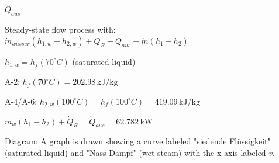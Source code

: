 \( \dot{Q}_{aus} \)  

Steady-state flow process with:  
\( \dot{m}_{wasser} (h_{1,w} - h_{2,w}) + \dot{Q}_R - \dot{Q}_{aus} + \dot{m}(h_{1} - h_{2}) \)  

\( h_{1,w} = h_f(70^\circ C) \) (saturated liquid)  

A-2:  
\( h_f(70^\circ C) = 202.98 \, \text{kJ/kg} \)  

A-4/A-6:  
\( h_{2,w}(100^\circ C) = h_f(100^\circ C) = 419.09 \, \text{kJ/kg} \)  

\( \dot{m}_w(h_1 - h_2) + \dot{Q}_R = \dot{Q}_{aus} = 62.782 \, \text{kW} \)  

Diagram:  
A graph is drawn showing a curve labeled "siedende Flüssigkeit" (saturated liquid) and "Nass-Dampf" (wet steam) with the x-axis labeled \( v \).